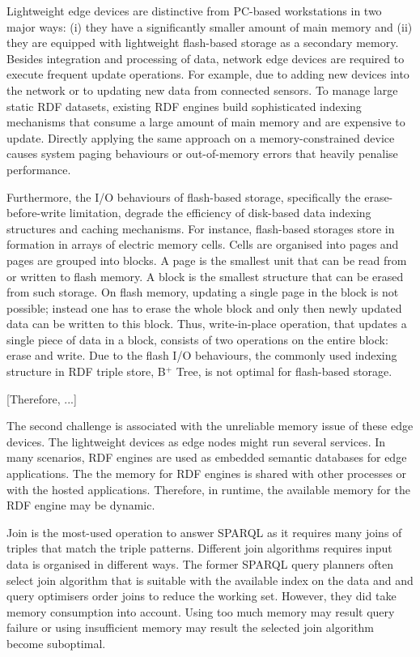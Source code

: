 Lightweight edge devices are distinctive from PC-based workstations in two major ways: (i) they have a significantly smaller amount of main memory and (ii) they are equipped
with lightweight flash-based storage as a secondary memory.
Besides integration and processing of data, network edge devices are required to execute frequent update operations. 
For example, due to adding new devices into the network or to updating new data from connected sensors. 
To manage large static RDF datasets, existing RDF engines build sophisticated indexing mechanisms that consume a large amount of main memory and are expensive to update.
Directly applying the same approach on a memory-constrained device causes system paging behaviours or out-of-memory errors that heavily penalise performance.

Furthermore, the I/O behaviours of flash-based storage, specifically the erase-before-write limitation, degrade the efficiency of disk-based data indexing structures and caching
mechanisms.
For instance, flash-based storages store in formation in arrays of electric memory cells.
Cells are organised into pages and pages are grouped into blocks. 
A page is the smallest unit that can be read from or written to flash memory.
A block is the smallest structure that can be erased from such storage. 
On flash memory, updating a single page in the block is not possible; instead one has to erase the whole block and only then newly updated data can be written to this block.
Thus, write-in-place operation, that updates a single piece of data in a block, consists of two operations on the entire block: erase and write. 
Due to the flash I/O behaviours, the commonly used indexing structure in RDF triple store, B$^+$ Tree, is not optimal for flash-based storage.

[Therefore, ...]

The second challenge is associated with the unreliable memory issue of these edge devices. 
The lightweight devices as edge nodes might run several services.
In many scenarios, RDF engines are used as embedded semantic databases for edge applications.
The the memory for RDF engines is shared with other processes or with the hosted applications.
Therefore, in runtime, the available memory for the RDF engine may be dynamic.

Join is the most-used operation to answer SPARQL as it requires many joins of triples that match the triple patterns.
Different join algorithms requires input data is organised in different ways.
The former SPARQL query planners often select join algorithm that is suitable with the available index on the data and and query optimisers order joins to reduce the working set.
However, they did take memory consumption into account.
Using too much memory may result query failure or using insufficient memory may result the selected join algorithm become suboptimal.

